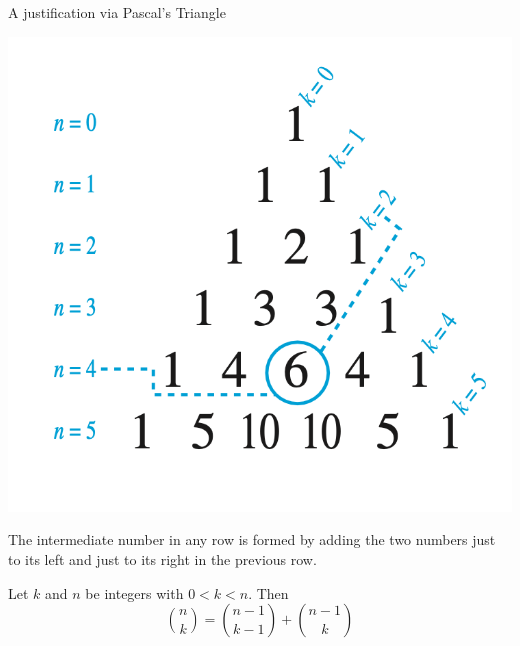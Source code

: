 \documentclass[10pt]{beamer}
\begin{document}
\begin{frame}{A justification via Pascal's Triangle}
\footnotesize 
\begin{minipage}{.5\textwidth}
\begin{center}
\end{center}
\end{minipage}
\hfill 
\begin{minipage}{.45\textwidth}
\begin{center}
\includegraphics[width=.95\textwidth]{images/pascals_triangle.png}
\end{center}
\end{minipage}

\vfill 
\begin{myredbox}[title=Remark]
The intermediate number in any row is formed by adding the two numbers just to its left and just to its right in the previous row.
\end{myredbox}
\vfill 
\begin{mygreenbox}[title=\text{Pascal's Identity}]
Let $k$ and $n$ be integers with $0 < k <n$. Then
\[ \binom{n}{k} =\binom{n-1}{k-1} + \binom{n-1}{k} \]
\end{mygreenbox}



\end{frame}
\end{document}
